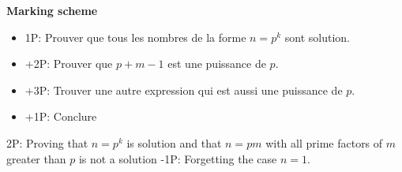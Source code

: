 \textbf{Marking scheme}

\begin{itemize}
    \item 1P: Prouver que tous les nombres de la forme $n=p^k$ sont solution.
    \item +2P: Prouver que $p+m-1$ est une puissance de $p$.
    \item +3P: Trouver une autre expression qui est aussi une puissance de $p$.
    \item +1P: Conclure
\end{itemize}

2P: Proving that $n= p^k$ is solution and that $n = pm$ with all prime factors of $m$ greater than $p$ is not a solution \newline
-1P: Forgetting the case $n=1$.